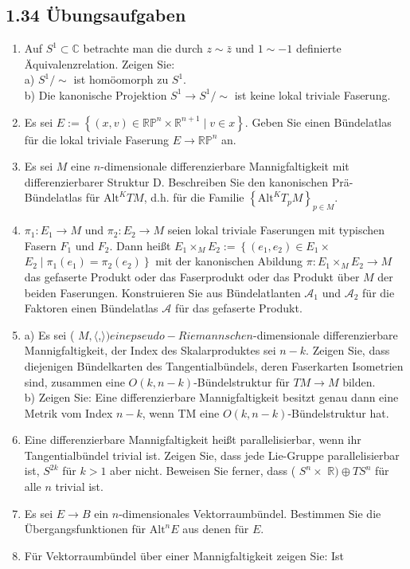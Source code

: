 \subsection*{1.34 Übungsaufgaben}
\begin{enumerate}
  \item Auf $S^{1} \subset \mathbb{C}$ betrachte man die durch $z \sim \bar{z}$ und $1 \sim-1$ definierte Äquivalenzrelation. Zeigen Sie:\\
a) $S^{1} / \sim$ ist homöomorph zu $S^{1}$.\\
b) Die kanonische Projektion $S^{1} \rightarrow S^{1} / \sim$ ist keine lokal triviale Faserung.
  \item Es sei $E:=\left\{(x, v) \in \mathbb{R P}^{n} \times \mathbb{R}^{n+1} \mid v \in x\right\}$. Geben Sie einen Bündelatlas für die lokal triviale Faserung $E \rightarrow \mathbb{R} \mathbb{P}^{n}$ an.
  \item Es sei $M$ eine $n$-dimensionale differenzierbare Mannigfaltigkeit mit differenzierbarer Struktur D. Beschreiben Sie den kanonischen Prä-Bündelatlas für $\mathrm{Alt}^{K} T M$, d.h. für die Familie $\left\{\mathrm{Alt}^{K} T_{p} M\right\}_{p \in M}$.
  \item $\pi_{1}: E_{1} \rightarrow M$ und $\pi_{2}: E_{2} \rightarrow M$ seien lokal triviale Faserungen mit typischen Fasern $F_{1}$ und $F_{2}$. Dann heißt $E_{1} \times_{M} E_{2}:=\left\{\left(e_{1}, e_{2}\right) \in E_{1} \times\right.$ $\left.E_{2} \mid \pi_{1}\left(e_{1}\right)=\pi_{2}\left(e_{2}\right)\right\}$ mit der kanonischen Abildung $\pi: E_{1} \times_{M} E_{2} \rightarrow M$ das gefaserte Produkt oder das Faserprodukt oder das Produkt über $M$ der beiden Faserungen. Konstruieren Sie aus Bündelatlanten $\mathcal{A}_{1}$ und $\mathcal{A}_{2}$ für die Faktoren einen Bündelatlas $\mathcal{A}$ für das gefaserte Produkt.
  \item a) Es sei ( $M,\langle$,$\rangle ) eine pseudo-Riemannsche n$-dimensionale differenzierbare Mannigfaltigkeit, der Index des Skalarproduktes sei $n-k$. Zeigen Sie, dass diejenigen Bündelkarten des Tangentialbündels, deren Faserkarten Isometrien sind, zusammen eine $O(k, n-k)$-Bündelstruktur für $T M \rightarrow M$ bilden.\\
b) Zeigen Sie: Eine differenzierbare Mannigfaltigkeit besitzt genau dann eine Metrik vom Index $n-k$, wenn TM eine $O(k, n-k)$-Bündelstruktur hat.
  \item Eine differenzierbare Mannigfaltigkeit heißt parallelisierbar, wenn ihr Tangentialbündel trivial ist. Zeigen Sie, dass jede Lie-Gruppe parallelisierbar ist, $S^{2 k}$ für $k>1$ aber nicht. Beweisen Sie ferner, dass ( $S^{n} \times$ $\mathbb{R}) \oplus T S^{n}$ für alle $n$ trivial ist.
  \item Es sei $E \rightarrow B$ ein $n$-dimensionales Vektorraumbündel. Bestimmen Sie die Übergangsfunktionen für $\mathrm{Alt}^{n} E$ aus denen für $E$.
  \item Für Vektorraumbündel über einer Mannigfaltigkeit zeigen Sie: Ist
\end{enumerate}

